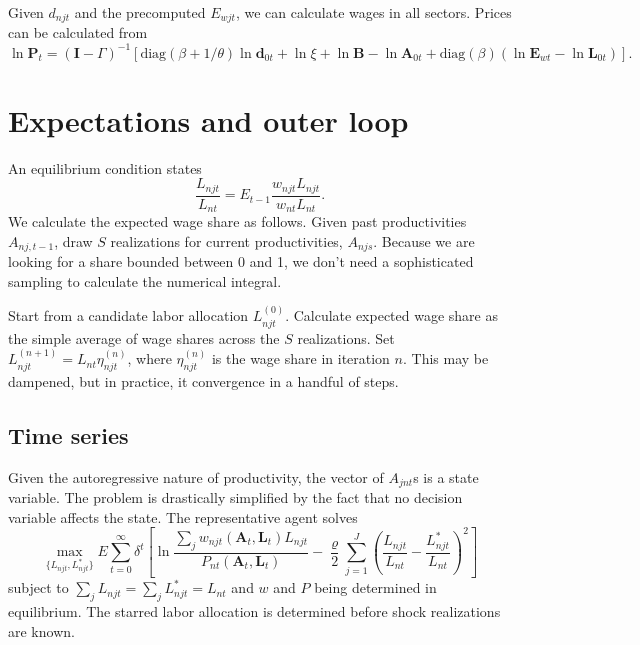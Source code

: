 \documentclass[12pt]{article}
\begin{document}
Given $d_{njt}$ and the precomputed $E_{wjt}$, we can calculate wages in all sectors. Prices can be calculated from
\[
\ln\mathbf P_{t} = 
(\mathbf I-\Gamma)^{-1}[\text{diag}(\beta+1/\theta) \ln\mathbf d_{0t}  
+\ln\xi
	+ \ln\mathbf B
	- \ln\mathbf A_{0t}
+
\text{diag}(\beta)(\ln\mathbf E_{wt}-\ln\mathbf L_{0t})]
 .  
\]

\section{Expectations and outer loop}
An equilibrium condition states
\begin{equation}
	\frac 
		{L_{njt}}
		{L_{nt}}
	=
	E_{t-1}\frac 
		{w_{njt}L_{njt}}
		{w_{nt}L_{nt}}.
\end{equation}
We calculate the expected wage share as follows. Given past productivities $A_{nj,t-1}$, draw $S$ realizations for current productivities, $A_{njs}$. Because we are looking for a share bounded between 0 and 1, we don't need a sophisticated sampling to calculate the numerical integral. 

Start from a candidate labor allocation $L_{njt}^{(0)}$. Calculate expected wage share as the simple average of wage shares across the $S$ realizations. Set $L_{njt}^{(n+1)} = L_{nt}\eta_{njt}^{(n)}$, where $\eta_{njt}^{(n)}$ is the wage share in iteration $n$. This may be dampened, but in practice, it convergence in a handful of steps.

\subsection{Time series}
Given the autoregressive nature of productivity, the vector of $A_{jnt}$s is a state variable. The problem is drastically simplified by the fact that no decision variable affects the state. The representative agent solves
\[
\max_{\{L_{njt}, L_{njt}^*\}}
E
\sum_{t=0}^{\infty} 
	\delta^{t} 
	\left[
	\ln \frac 
		{\sum_j w_{njt}(\mathbf A_{t}, \mathbf L_{t})L_{njt}}
		{P_{nt}(\mathbf A_{t}, \mathbf L_{t})}
	-\frac \varrho 2
		\sum_{j=1}^J
		\left(
			\frac {L_{njt}} {L_{nt}}
			- 
			\frac {L_{njt}^*} {L_{nt}}
		\right)^2
	\right]
\]
subject to $\sum_j L_{njt}=\sum_j L_{njt}^*=L_{nt}$ and $w$ and $P$ being determined in equilibrium. The starred labor allocation is determined before shock realizations are known.
\end{document}
